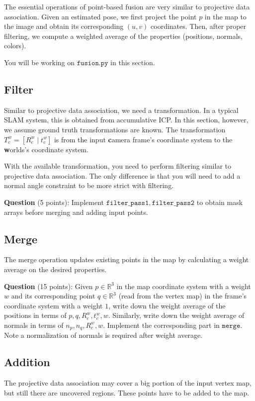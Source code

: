 \documentclass[12pt, a4paper]{article}
\begin{document}
The essential operations of point-based fusion are very similar to projective data association. Given an estimated pose, we first project the point $p$ in the map to the image and obtain its corresponding $(u, v)$ coordinates. Then, after proper filtering, we compute a weighted average of the properties (positions, normals, colors).

You will be working on $\mathtt{fusion.py}$ in this section.

\subsection{Filter}
Similar to projective data association, we need a transformation. In a typical SLAM system, this is obtained from accumulative ICP. In this section, however, we assume ground truth transformations are known. The transformation $T_c^w = [R_c^w \mid t_c^w]$ is from the input \textbf{c}amera frame's coordinate system to the \textbf{w}orlds's coordinate system.

With the available transformation, you need to perform filtering similar to projective data association. The only difference is that you will need to add a normal angle constraint to be more strict with filtering.

\textbf{Question} (5 points): Implement $\mathtt{filter\_pass1, filter\_pass2}$ to obtain mask arrays before merging and adding input points.

\subsection{Merge}
The merge operation updates existing points in the map by calculating a weight average on the desired properties.

\textbf{Question} (15 points): Given $p\in \mathbb{R}^3$ in the map coordinate system with a weight $w$ and its corresponding point $q \in \mathbb{R}^3$ (read from the vertex map) in the frame's coordinate system with a weight $1$, write down the weight average of the positions in terms of $p, q, R_c^w, t_c^w, w$. Similarly, write down the weight average of normals in terms of $n_p, n_q, R_c^w, w$. Implement the corresponding part in $\mathtt{merge}$. Note a normalization of normals is required after weight average.

\subsection{Addition}
The projective data association may cover a big portion of the input vertex map, but still there are uncovered regions. These points have to be added to the map.
\end{document}
